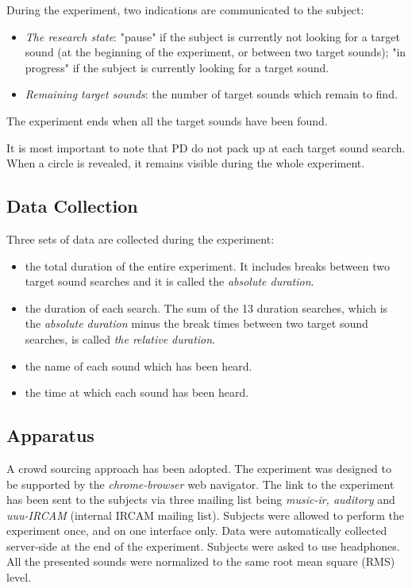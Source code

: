 \documentclass{aes2e}
\begin{document}
During the experiment, two indications are communicated to the subject:
\begin{itemize}
\item \textit{The research state}: "pause" if the subject is currently not looking for a target sound (at the beginning of the experiment, or between two target sounds);  "in progress"  if the subject is currently looking for a target sound.
\item \textit{Remaining target sounds}: the number of target sounds which remain to find.
\end{itemize}

The experiment ends when all the target sounds have been found.

It is most important to note that PD do not pack up at each target sound search. When a circle is revealed, it remains visible during the whole experiment.



 
\subsection{Data Collection}
Three sets of data are collected during the experiment:
\begin{itemize}
\item the total duration of the entire experiment. It includes breaks between two target sound searches and it is called the \textit{absolute duration}.
\item the duration of each search. The sum of the 13 duration searches, which is the \textit{absolute duration} minus the break times between two target sound searches, is called \textit{the relative duration}.
\item the name of each sound which has been heard.
\item the time at which each sound has been heard.  
\end{itemize}



\subsection{Apparatus}
A crowd sourcing approach has been adopted. The experiment was designed to be supported by the  \textit{chrome-browser} web navigator. The link to the experiment has been sent to the subjects via three  mailing list being \textit{music-ir, auditory} and \textit{uuu-IRCAM} (internal IRCAM mailing list). Subjects were allowed to perform the experiment once, and on one interface only. Data were automatically collected server-side at the end of the experiment. Subjects were asked to use headphones. All the presented sounds were normalized to the same root mean square (RMS) level.
\end{document}
